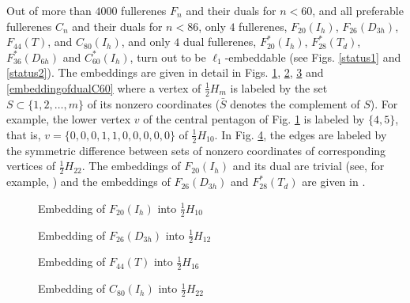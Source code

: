 Out of more than $4000$ fullerenes 
$F_n$ and their duals for $n<60$, and all preferable fullerenes 
$C_n$ and their duals for $n<86$, only $4$ fullerenes,
$F_{20}(I_h)$, $F_{26}(D_{3h})$, $F_{44}(T)$, and $C_{80}(I_h)$, 
and only $4$ dual fullerenes,
$F^*_{20}(I_h)$, $F^*_{28}(T_d)$, $F^*_{36}(D_{6h})$ and $C^*_{60}(I_h)$,
turn out to be $\ell_1$-embeddable (see Figs. \ref{status1} and \ref{status2}). 
The embeddings  
are given in detail in Figs. 
\ref{embeddingofF20}, 
\ref{embeddingofF26}, 
\ref{embeddingofF44} and 
\ref{embeddingofdualC60} where a vertex of $\frac{1}{2}H_m$ is labeled 
by the set $S\subset\{1,2,\dots,m\}$ of its nonzero coordinates  ($\bar{S}$ 
denotes the complement of $S$). For example, the lower vertex $v$ of the central 
pentagon of Fig. \ref{embeddingofF20} is labeled by $\{4,5\}$, that is, 
$v=\{0,0,0,1,1,0,0,0,0,0\}$ of $\frac{1}{2}H_{10}$.
In Fig. \ref{embeddingofC80}, the edges are labeled by the symmetric difference
between sets of nonzero coordinates of corresponding vertices of $\frac{1}{2}H_{22}$.
The embeddings of $F_{20}(I_h)$ and its dual are trivial (see, for example, \cite{dl94}) 
and the embeddings of $F_{26}(D_{3h})$ and $F^*_{28}(T_d)$ are given in \cite{dg96}.

\begin{figure}[htb]
\begin{center}
\caption{Embedding of $F_{20}(I_h)$ into $\frac{1}{2}H_{10}$}\label{embeddingofF20}
\end{center}
\end{figure}

\begin{figure}[hbt]
\begin{center}
\caption{Embedding of $F_{26}(D_{3h})$ into $\frac{1}{2}H_{12}$}\label{embeddingofF26}
\end{center}
\end{figure}

\begin{figure}[hbt]
\begin{center}
\caption{Embedding of $F_{44}(T)$ into $\frac{1}{2}H_{16}$}\label{embeddingofF44}
\end{center}
\end{figure}

\begin{figure}[hbtp]
\begin{center}
\caption{Embedding of $C_{80}(I_h)$ into $\frac{1}{2}H_{22}$}\label{embeddingofC80}
\end{center}
\end{figure}

